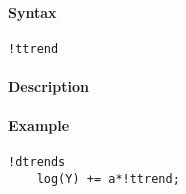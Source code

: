 


	\paragraph{Syntax}\label{syntax}

\begin{verbatim}
!ttrend
\end{verbatim}

\paragraph{Description}\label{description}

\paragraph{Example}\label{example}

\begin{verbatim}
!dtrends
    log(Y) += a*!ttrend;
\end{verbatim}


